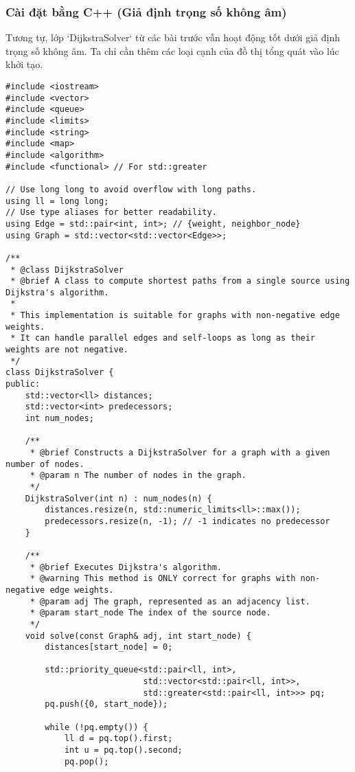 \documentclass[a4paper,12pt]{article}
\begin{document}
\subsubsection{Cài đặt bằng C++ (Giả định trọng số không âm)}
Tương tự, lớp `DijkstraSolver` từ các bài trước vẫn hoạt động tốt dưới giả định trọng số không âm. Ta chỉ cần thêm các loại cạnh của đồ thị tổng quát vào lúc khởi tạo.
\begin{lstlisting}[style=cppstyle, caption={Xây dựng đồ thị tổng quát trong C++ (chỉ trọng số không âm).}, label={lst:cpp_16}]
#include <iostream>
#include <vector>
#include <queue>
#include <limits>
#include <string>
#include <map>
#include <algorithm>
#include <functional> // For std::greater

// Use long long to avoid overflow with long paths.
using ll = long long;
// Use type aliases for better readability.
using Edge = std::pair<int, int>; // {weight, neighbor_node}
using Graph = std::vector<std::vector<Edge>>;

/**
 * @class DijkstraSolver
 * @brief A class to compute shortest paths from a single source using Dijkstra's algorithm.
 *
 * This implementation is suitable for graphs with non-negative edge weights.
 * It can handle parallel edges and self-loops as long as their weights are not negative.
 */
class DijkstraSolver {
public:
    std::vector<ll> distances;
    std::vector<int> predecessors;
    int num_nodes;

    /**
     * @brief Constructs a DijkstraSolver for a graph with a given number of nodes.
     * @param n The number of nodes in the graph.
     */
    DijkstraSolver(int n) : num_nodes(n) {
        distances.resize(n, std::numeric_limits<ll>::max());
        predecessors.resize(n, -1); // -1 indicates no predecessor
    }

    /**
     * @brief Executes Dijkstra's algorithm.
     * @warning This method is ONLY correct for graphs with non-negative edge weights.
     * @param adj The graph, represented as an adjacency list.
     * @param start_node The index of the source node.
     */
    void solve(const Graph& adj, int start_node) {
        distances[start_node] = 0;
        
        std::priority_queue<std::pair<ll, int>, 
                            std::vector<std::pair<ll, int>>, 
                            std::greater<std::pair<ll, int>>> pq;
        pq.push({0, start_node});

        while (!pq.empty()) {
            ll d = pq.top().first;
            int u = pq.top().second;
            pq.pop();


\end{lstlisting}
\end{document}
